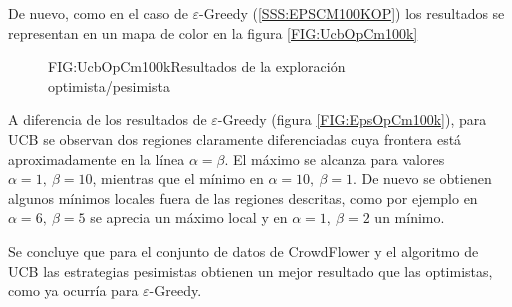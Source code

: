 De nuevo, como en el caso de $\varepsilon$-Greedy (\ref{SSS:EPSCM100KOP}) los resultados se representan en un mapa de color en la figura \ref{FIG:UcbOpCm100k}

\begin{figure}[Mapa de color de UCB]{FIG:UcbOpCm100k}{Resultados de la exploración optimista/pesimista}
\end{figure}

A diferencia de los resultados de $\varepsilon$-Greedy (figura \ref{FIG:EpsOpCm100k}), para UCB se observan dos regiones claramente diferenciadas cuya frontera está aproximadamente en la línea $\alpha = \beta$. El máximo se alcanza para valores $\alpha=1, \ \beta=10$, mientras que el mínimo en $\alpha=10, \ \beta = 1$. De nuevo se obtienen algunos mínimos locales fuera de las regiones descritas, como por ejemplo en $\alpha=6, \ \beta = 5$ se aprecia un máximo local y en $\alpha=1, \ \beta=2$ un mínimo.

Se concluye que para el conjunto de datos de CrowdFlower y el algoritmo de UCB las estrategias pesimistas obtienen un mejor resultado que las optimistas, como ya ocurría para $\varepsilon$-Greedy.